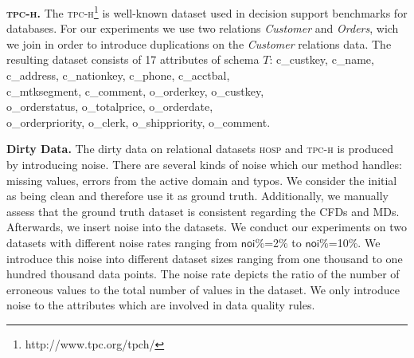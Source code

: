 \textbf{\textsc{tpc-h}.} The \textsc{tpc-h}\footnote{http://www.tpc.org/tpch/} is well-known dataset used in decision support benchmarks for databases. For our experiments we use two relations \textit{Customer} and \textit{Orders}, wich we join in order to introduce duplications on the \textit{Customer} relations data. The resulting dataset consists of 17 attributes of schema $T$: \textsf{c\_custkey}, \textsf{c\_name}, \textsf{c\_address},  \textsf{c\_nationkey}, \textsf{c\_phone}, \textsf{c\_acctbal},\\ \textsf{c\_mtksegment}, \textsf{c\_comment}, \textsf{o\_orderkey}, \textsf{o\_custkey},\\ \textsf{o\_orderstatus}, \textsf{o\_totalprice}, \textsf{o\_orderdate},\\ \textsf{o\_orderpriority}, \textsf{o\_clerk}, \textsf{o\_shippriority}, \textsf{o\_comment}. 

\textbf{Dirty Data.} The dirty data on relational datasets \textsc{hosp} and \textsc{tpc-h} is produced by introducing noise. There are several kinds of noise which our method handles: missing values, errors from the active domain and typos. We consider the initial as being clean and therefore use it as ground truth. Additionally, we manually assess that the ground truth dataset is consistent regarding the CFDs and MDs. Afterwards, we insert noise into the datasets. We conduct our experiments on two datasets with different noise rates ranging from $\mathsf{noi\%}$=2$\%$ to $\mathsf{noi\%}$=10$\%$. We introduce this noise into different dataset sizes ranging from one thousand to one hundred thousand data points. The noise rate depicts the ratio of the number of erroneous values to the total number of values in the dataset. We only introduce noise to the attributes which are involved in data quality rules.

